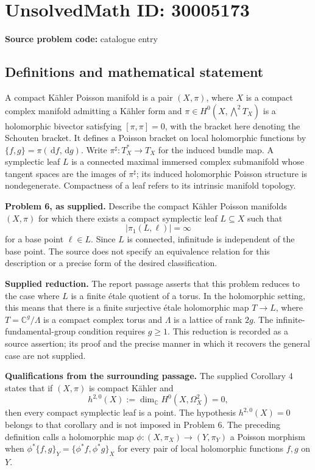 \documentclass[11pt]{article}
\newcommand{\C}{\mathbb{C}}
\newcommand{\dd}{\,\mathrm{d}}
\begin{document}
\section*{UnsolvedMath ID: 30005173}
\textbf{Source problem code:} catalogue entry
\subsection{Definitions and mathematical statement}
A compact Kähler Poisson manifold is a pair \((X,\pi)\), where \(X\) is a compact complex manifold admitting a Kähler form and \(\pi\in H^0(X,\bigwedge^2T_X)\) is a holomorphic bivector satisfying \([\pi,\pi]=0\), with the bracket here denoting the Schouten bracket. It defines a Poisson bracket on local holomorphic functions by \(\{f,g\}=\pi(\dd f,\dd g)\). Write \(\pi^{\sharp}:T_X^*\to T_X\) for the induced bundle map. A symplectic leaf \(L\) is a connected maximal immersed complex submanifold whose tangent spaces are the images of \(\pi^{\sharp}\); its induced holomorphic Poisson structure is nondegenerate. Compactness of a leaf refers to its intrinsic manifold topology.

\textbf{Problem 6, as supplied.} Describe the compact Kähler Poisson manifolds \((X,\pi)\) for which there exists a compact symplectic leaf \(L\subseteq X\) such that
\[
\lvert\pi_1(L,\ell)\rvert=\infty
\]
for a base point \(\ell\in L\). Since \(L\) is connected, infinitude is independent of the base point. The source does not specify an equivalence relation for this description or a precise form of the desired classification.

\textbf{Supplied reduction.} The report passage asserts that this problem reduces to the case where \(L\) is a finite étale quotient of a torus. In the holomorphic setting, this means that there is a finite surjective étale holomorphic map \(T\to L\), where \(T=\C^g/\Lambda\) is a compact complex torus and \(\Lambda\) is a lattice of rank \(2g\). The infinite-fundamental-group condition requires \(g\geq 1\). This reduction is recorded as a source assertion; its proof and the precise manner in which it recovers the general case are not supplied.

\textbf{Qualifications from the surrounding passage.} The supplied Corollary 4 states that if \((X,\pi)\) is compact Kähler and
\[
h^{2,0}(X):=\dim_{\C}H^0(X,\Omega_X^2)=0,
\]
then every compact symplectic leaf is a point. The hypothesis \(h^{2,0}(X)=0\) belongs to that corollary and is not imposed in Problem 6. The preceding definition calls a holomorphic map \(\phi:(X,\pi_X)\to(Y,\pi_Y)\) a Poisson morphism when \(\phi^*\{f,g\}_Y=\{\phi^*f,\phi^*g\}_X\) for every pair of local holomorphic functions \(f,g\) on \(Y\).
\end{document}
